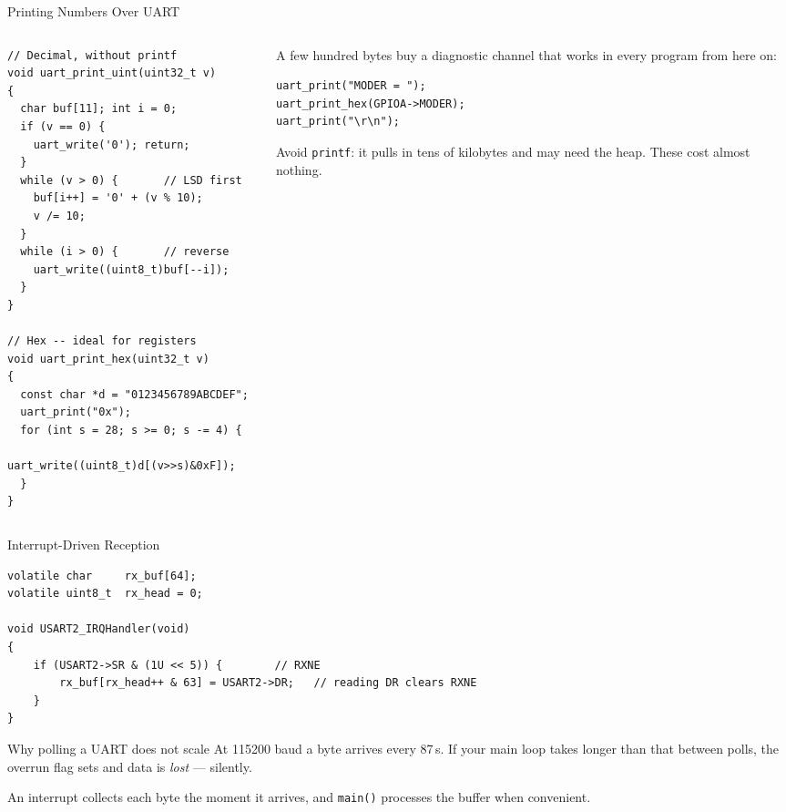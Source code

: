 \documentclass[9pt,aspectratio=169,xcolor=table]{beamer}
\begin{document}
\begin{frame}[fragile]{Printing Numbers Over UART}
    \begin{columns}[c]
    \begin{column}{.56\textwidth}
        \begin{lstlisting}[style=myc, basicstyle=\scriptsize\ttfamily]
// Decimal, without printf
void uart_print_uint(uint32_t v)
{
  char buf[11]; int i = 0;
  if (v == 0) {
    uart_write('0'); return;
  }
  while (v > 0) {       // LSD first
    buf[i++] = '0' + (v % 10);
    v /= 10;
  }
  while (i > 0) {       // reverse
    uart_write((uint8_t)buf[--i]);
  }
}

// Hex -- ideal for registers
void uart_print_hex(uint32_t v)
{
  const char *d = "0123456789ABCDEF";
  uart_print("0x");
  for (int s = 28; s >= 0; s -= 4) {
    uart_write((uint8_t)d[(v>>s)&0xF]);
  }
}
    \end{lstlisting}
    \end{column}
    \begin{column}{.40\textwidth}
        {\small A few hundred bytes buy a diagnostic channel that works in
        every program from here on:}

        \begin{lstlisting}[style=myc, basicstyle=\scriptsize\ttfamily]
uart_print("MODER = ");
uart_print_hex(GPIOA->MODER);
uart_print("\r\n");
        \end{lstlisting}

        \vspace{2mm}
        {\small \alert{Avoid \texttt{printf}}: it pulls in tens of kilobytes
        and may need the heap. These cost almost nothing.}
    \end{column}
    \end{columns}
\end{frame}

\begin{frame}[fragile]{Interrupt-Driven Reception}
        \begin{lstlisting}[style=myc, basicstyle=\footnotesize\ttfamily]
volatile char     rx_buf[64];
volatile uint8_t  rx_head = 0;

void USART2_IRQHandler(void)
{
    if (USART2->SR & (1U << 5)) {        // RXNE
        rx_buf[rx_head++ & 63] = USART2->DR;   // reading DR clears RXNE
    }
}
\end{lstlisting}

    \vspace{2mm}
    \begin{block}{Why polling a UART does not scale}
        At 115200 baud a byte arrives every \alert{87\,\textmu s}. If your main
        loop takes longer than that between polls, the \alert{overrun} flag sets
        and data is \emph{lost} --- silently.

        \vspace{1mm}
        An interrupt collects each byte the moment it arrives, and
        \texttt{main()} processes the buffer when convenient.
    \end{block}
\end{frame}
\end{document}
